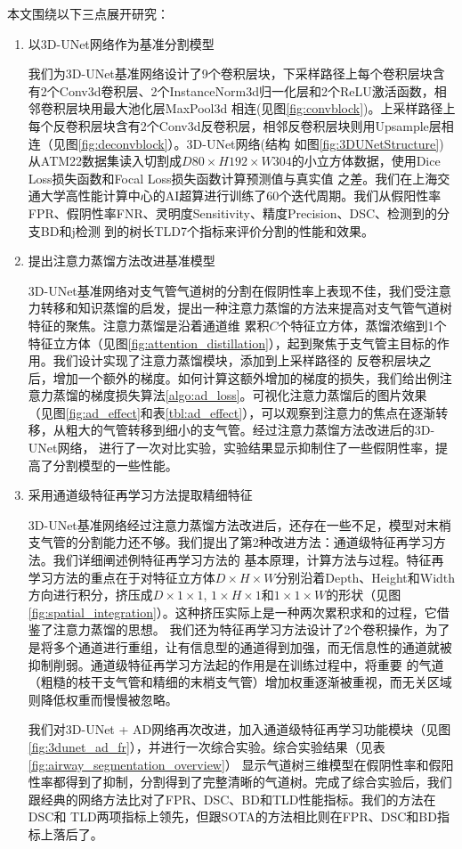 本文围绕以下三点展开研究：
\begin{enumerate}
    \item {\heiti 以3D-UNet网络作为基准分割模型}

    我们为3D-UNet基准网络设计了9个卷积层块，下采样路径上每个卷积层块含有2个Conv3d卷积层、2个InstanceNorm3d归一化层和2个ReLU激活函数，相邻卷积层块用最大池化层MaxPool3d
    相连(见图\ref{fig:convblock})。上采样路径上每个反卷积层块含有2个Conv3d反卷积层，相邻反卷积层块则用Upsample层相连（见图\ref{fig:deconvblock}）。3D-UNet网络(结构
    如图\ref{fig:3DUNetStructure})从ATM22数据集读入切割成$D80 \times H192 \times W304$的小立方体数据，使用Dice Loss损失函数和Focal Loss损失函数计算预测值与真实值
    之差。我们在上海交通大学高性能计算中心的AI超算进行训练了60个迭代周期。我们从假阳性率FPR、假阴性率FNR、灵明度Sensitivity、精度Precision、DSC、检测到的分支BD和j检测
    到的树长TLD7个指标来评价分割的性能和效果。

    \item {\heiti 提出注意力蒸馏方法改进基准模型}

    3D-UNet基准网络对支气管气道树的分割在假阴性率上表现不佳，我们受注意力转移和知识蒸馏的启发，提出一种注意力蒸馏的方法来提高对支气管气道树特征的聚焦。注意力蒸馏是沿着通道维
    累积$C$个特征立方体，蒸馏浓缩到1个特征立方体（见图\ref{fig:attention_distillation}），起到聚焦于支气管主目标的作用。我们设计实现了注意力蒸馏模块，添加到上采样路径的
    反卷积层块之后，增加一个额外的梯度。如何计算这额外增加的梯度的损失，我们给出例注意力蒸馏的梯度损失算法\ref{algo:ad_loss}。可视化注意力蒸馏后的图片效果
    （见图\ref{fig:ad_effect}和表\ref{tbl:ad_effect}），可以观察到注意力的焦点在逐渐转移，从粗大的气管转移到细小的支气管。经过注意力蒸馏方法改进后的3D-UNet网络，
    进行了一次对比实验，实验结果显示抑制住了一些假阴性率，提高了分割模型的一些性能。

    \item {\heiti 采用通道级特征再学习方法提取精细特征}

    3D-UNet基准网络经过注意力蒸馏方法改进后，还存在一些不足，模型对末梢支气管的分割能力还不够。我们提出了第2种改进方法：通道级特征再学习方法。我们详细阐述例特征再学习方法的
    基本原理，计算方法与过程。特征再学习方法的重点在于对特征立方体$D \times H \times W$分别沿着Depth、Height和Width方向进行积分，挤压成$D \times 1 \times 1$, 
    $1 \times H \times 1$和$1 \times 1 \times W$的形状（见图\ref{fig:spatial_integration}）。这种挤压实际上是一种两次累积求和的过程，它借鉴了注意力蒸馏的思想。
    我们还为特征再学习方法设计了2个卷积操作，为了是将多个通道进行重组，让有信息型的通道得到加强，而无信息性的通道就被抑制削弱。通道级特征再学习方法起的作用是在训练过程中，将重要
    的气道（粗糙的枝干支气管和精细的末梢支气管）增加权重逐渐被重视，而无关区域则降低权重而慢慢被忽略。

    我们对3D-UNet + AD网络再次改进，加入通道级特征再学习功能模块（见图\ref{fig:3dunet_ad_fr}），并进行一次综合实验。综合实验结果（见表\ref{fig:airway_segmentation_overview}）
    显示气道树三维模型在假阴性率和假阳性率都得到了抑制，分割得到了完整清晰的气道树。完成了综合实验后，我们跟经典的网络方法比对了FPR、DSC、BD和TLD性能指标。我们的方法在DSC和
    TLD两项指标上领先，但跟SOTA的方法相比则在FPR、DSC和BD指标上落后了。
\end{enumerate}

